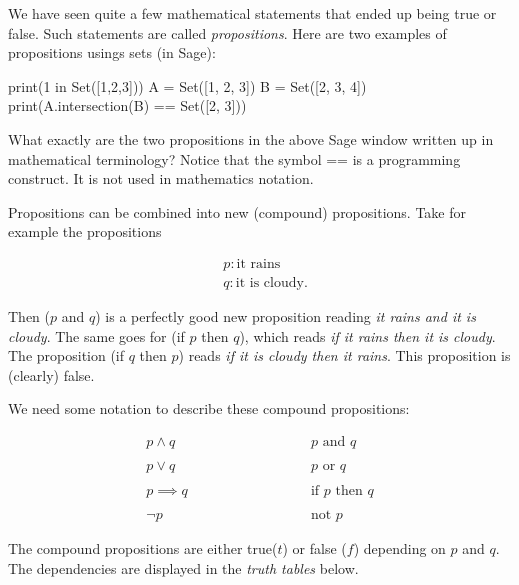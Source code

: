 \documentclass{article}
\begin{document}
We have seen quite a few mathematical statements that ended up 
being true or false. Such statements are called \emph{propositions}.
Here are two examples of propositions usings sets (in Sage):

\begin{sage}
print(1 in Set([1,2,3]))
A = Set([1, 2, 3])
B = Set([2, 3, 4])
print(A.intersection(B) == Set([2, 3])) 
\end{sage}

\beginshex
What exactly are the two propositions in the above Sage window written
up in mathematical terminology? Notice that the symbol == is
a programming construct. It is not used in mathematics notation.
\endshex

Propositions can be combined into
new (compound) propositions. Take for example the propositions

\begin{align*}
&p: \text{it rains}\\
&q: \text{it is cloudy}.
\end{align*}
  
  Then ($p$ and $q$) is a perfectly good
  new proposition reading \emph{it rains and it is cloudy}. The same goes for (if $p$ then $q$), which reads
  \emph{if it rains then it is cloudy}. The proposition (if $q$ then $p$) reads \emph{if it is cloudy then
    it rains}. This proposition is (clearly) false.


We need some notation to describe these compound propositions:

\begin{equation*}
\begin{array}{ll}
p \land q\qquad\qquad & \qquad\qquad p \text{ and } q\\
\\
p \lor q\qquad\qquad & \qquad\qquad p \text{ or } q\\
\\
p\implies q\qquad\qquad & \qquad\qquad \text{if } p \text{ then } q\\
\\
\neg p\qquad\qquad & \qquad\qquad \text{not } p
\end{array}
\end{equation*}

The compound propositions are either true($t$) or false ($f$) depending on
$p$ and $q$. The dependencies are displayed in the \emph{truth tables} below.
\end{document}

